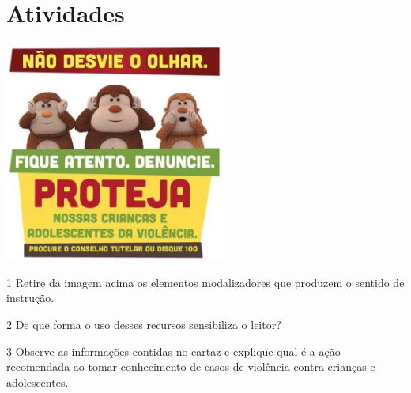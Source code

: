 
\section*{Atividades}

\includegraphics[width=2.85536in,height=2.85536in]{./imgSAEB_7_POR/media/image9.png}



\num{1} Retire da imagem acima os elementos modalizadores que produzem o sentido de instrução.


\num{2} De que forma o uso desses recursos sensibiliza o leitor?


\num{3} Observe as informações contidas no cartaz e explique qual é a ação
recomendada ao tomar conhecimento de casos de violência contra crianças e adolescentes.

